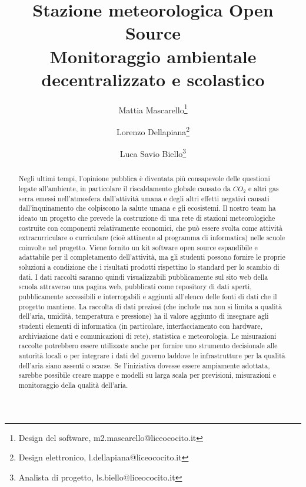 \documentclass[12pt, a4paper]{article}
\title{Stazione meteorologica Open Source\\\Large{Monitoraggio ambientale decentralizzato e scolastico}}
\author{Mattia Mascarello\thanks{Design del software, m2.mascarello@liceococito.it}\and Lorenzo Dellapiana\thanks{Design elettronico, l.dellapiana@liceococito.it}\and Luca Savio Biello\thanks{Analista di progetto, ls.biello@liceococito.it}}
\date{\parbox{\linewidth}{\centering%
		\today\endgraf\bigskip
		Liceo Scientifico Statale ``Leonardo Cocito''}}
\begin{document}
	\maketitle
	
	\begin{abstract}
		Negli ultimi tempi, l'opinione pubblica è diventata più consapevole delle questioni legate all'ambiente, in particolare il riscaldamento globale causato da $CO_2$ e altri gas serra emessi nell'atmosfera dall'attività umana e  degli altri effetti negativi causati dall'inquinamento che colpiscono la salute umana e gli ecosistemi.
		Il nostro team ha ideato un progetto che prevede la costruzione di una rete di stazioni meteorologiche costruite con componenti relativamente economici, che può essere svolta come attività extracurriculare o curriculare (cioè attinente al programma di informatica) nelle scuole coinvolte nel progetto.
		Viene fornito un kit software open source espandibile e adattabile per il completamento dell'attività, ma gli studenti possono fornire le proprie soluzioni a condizione che i risultati prodotti rispettino lo standard per lo scambio di dati.
		I dati raccolti saranno quindi visualizzabili pubblicamente sul sito web della scuola attraverso una pagina web, pubblicati come repository di dati aperti, pubblicamente accessibili e interrogabili e aggiunti all'elenco delle fonti di dati che il progetto mantiene.
		La raccolta di dati preziosi (che include ma non si limita a qualità dell'aria, umidità, temperatura e pressione) ha il valore aggiunto di insegnare agli studenti elementi di informatica (in particolare, interfacciamento con hardware, archiviazione dati e comunicazioni di rete), statistica e meteorologia.
		Le misurazioni raccolte potrebbero essere utilizzate anche per fornire uno strumento decisionale alle autorità locali o per integrare i dati del governo laddove le infrastrutture per la qualità dell'aria siano assenti o scarse.
		Se l'iniziativa dovesse essere ampiamente adottata, sarebbe possibile creare mappe e modelli su larga scala per previsioni, misurazioni e monitoraggio della qualità dell'aria.
	\end{abstract}
	
\end{document}
